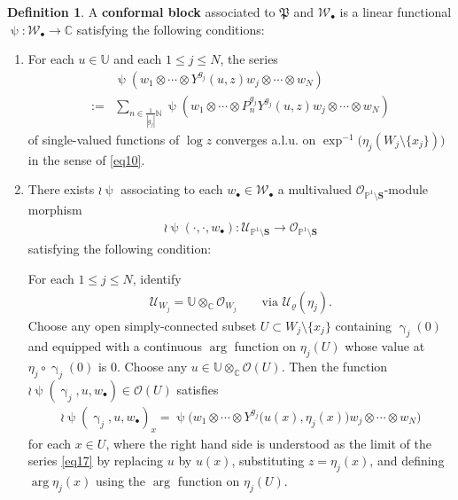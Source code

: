 \documentclass[11pt,b5paper,notitlepage]{article}
\theoremstyle{definition}
\newtheorem{df}{Definition}[subsection]
\theoremstyle{plain}
\newcommand{\fk}{\mathfrak}
\newcommand{\mc}{\mathcal}
\newcommand{\scr}{\mathscr}
\newcommand{\blt}{\bullet}
\newcommand{\Ubb}{\mathbb U}
\newcommand{\Cbb}{\mathbb C}
\newcommand{\Nbb}{\mathbb N}
\newcommand{\Pbb}{\mathbb P}
\newcommand{\Sbf}{\mathbf{S}}
\numberwithin{equation}{subsection}
\begin{document}
\begin{df}\label{lb8}
A \textbf{conformal block} associated to $\fk P$ and $\mc W_\blt$ is a linear functional $\uppsi:\mc W_\blt\rightarrow\Cbb$ satisfying the following conditions:
\begin{enumerate}
\item For each $u\in\Ubb$ and each $1\leq j\leq N$, the series
\begin{align}
&\uppsi(w_1\otimes\cdots\otimes Y^{g_j}(u,z)w_j\otimes\cdots\otimes w_N)\nonumber\\
:=&\sum_{n\in \frac 1{|g_j|}\Nbb}\uppsi(w_1\otimes\cdots\otimes P_n^{g_j}Y^{g_j}(u,z)w_j\otimes\cdots\otimes w_N)\label{eq17}
\end{align}
of single-valued functions of $\log z$ converges a.l.u. on $\exp^{-1}\big(\eta_j(W_j\setminus\{x_j\})\big)$  in the sense of \eqref{eq10}.
\item There exists $\wr\uppsi$ associating to each $w_\blt\in\mc W_\blt$ a multivalued $\scr O_{\Pbb^1\setminus\Sbf}$-module morphism 
\begin{align*}
\wr\uppsi(\cdot,\cdot,w_\blt):\scr U_{\Pbb^1\setminus\Sbf}\rightarrow\scr O_{\Pbb^1\setminus\Sbf}	
\end{align*}
satisfying the following condition: 

For each $1\leq j\leq N$,  identify 
\begin{align}
\scr U_{W_j}=\Ubb\otimes_\Cbb\scr O_{W_j}  \qquad\text{via }\mc U_\varrho(\eta_j).\label{eq38}
\end{align}
Choose   any open simply-connected subset $U\subset W_j\setminus\{x_j\}$ containing $\upgamma_j(0)$ and equipped with a continuous $\arg$ function on $\eta_j(U)$ whose value at $\eta_j\circ\upgamma_j(0)$ is $0$. Choose any $u\in\Ubb\otimes_\Cbb\scr O(U)$.  Then the function $\wr\uppsi(\upgamma_j,u,w_\blt)\in\scr O(U)$ satisfies   
\begin{align}
\wr\uppsi(\upgamma_j,u,w_\blt)_x=\uppsi\big(w_1\otimes\cdots\otimes Y^{g_j}\big(u(x),\eta_j(x)\big)w_j\otimes\cdots\otimes w_N\big)\label{eq18}	
\end{align}
for each $x\in U$, where the right hand side is understood as the limit of the series \eqref{eq17} by replacing $u$ by $u(x)$, substituting $z=\eta_j(x)$, and defining $\arg\eta_j(x)$ using the $\arg$ function on $\eta_j(U)$.
\end{enumerate}
\end{df}
\end{document}
